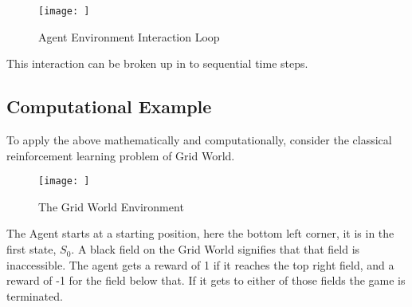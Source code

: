 \begin{figure}[h!]
    \centering
    \texttt{[image: ]}
    \caption{Agent Environment Interaction Loop}
    \label{fig:agent_env_inter}
\end{figure}

This interaction can be broken up in to sequential time steps.  

\subsection*{Computational Example}\label{subsec:grid_world}

To apply the above mathematically and computationally, consider the classical reinforcement learning problem of Grid World. 

\begin{figure}[h!]
    \centering
    \texttt{[image: ]}
    \caption{The Grid World Environment}
    \label{fig:grid_world}
\end{figure}

The Agent starts at a starting position, here the bottom left corner, it is in the first state, $S_0$. A black field on the Grid World signifies that that field is inaccessible. The agent gets a reward of 1 if it reaches the top right field, and a reward of -1 for the field below that. If it gets to either of those fields the game is terminated. 